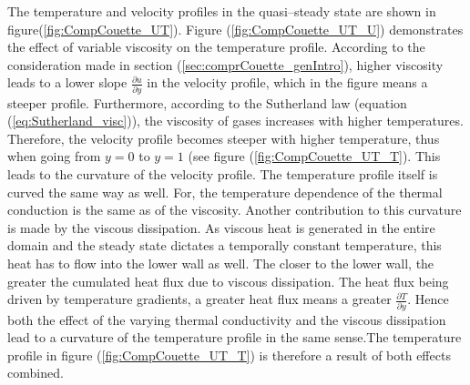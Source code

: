 \documentclass{report}
\begin{document}
The temperature and velocity profiles in the quasi--steady state are shown in figure(\ref{fig:CompCouette_UT}). Figure (\ref{fig:CompCouette_UT_U}) demonstrates the effect of variable viscosity on the temperature profile. According to the consideration made in section (\ref{sec:comprCouette_genIntro}), higher viscosity leads to a lower slope $\frac{\partial u}{\partial y}$ in the velocity profile, which in the figure means a steeper profile. Furthermore, according to the Sutherland law (equation (\ref{eq:Sutherland_visc})), the viscosity of gases increases with higher temperatures.
Therefore, the velocity profile becomes steeper with higher temperature, thus when going from $y=0$ to $y=1$ (see figure (\ref{fig:CompCouette_UT_T}). This leads to the curvature of the velocity profile.
The temperature profile itself is curved the same way as well. For, the temperature dependence of the thermal conduction is the same as of the viscosity. Another contribution to this curvature is made by the viscous dissipation. As viscous heat is generated in the entire domain and the steady state dictates a temporally constant temperature, this heat has to flow into the lower wall as well. The closer to the lower wall, the greater the cumulated heat flux due to viscous dissipation. The heat flux being driven by temperature gradients, a greater heat flux means a greater  $\frac{\partial T}{\partial y}$. 
Hence both the effect of the varying thermal conductivity and the viscous dissipation lead to a curvature of the temperature profile in the same sense.The temperature profile in figure (\ref{fig:CompCouette_UT_T}) is therefore a result of both effects combined.
\end{document}

